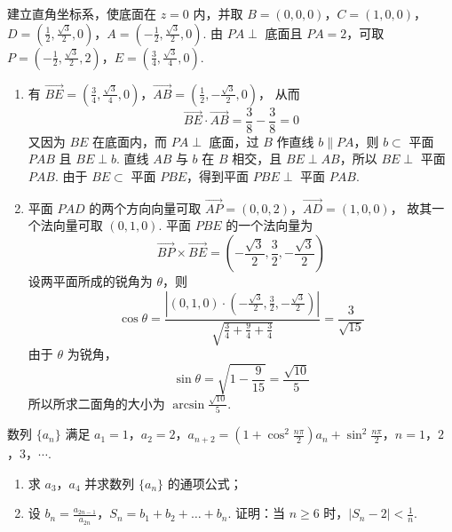 \begin{solution}
建立直角坐标系，使底面在 \(z=0\) 内，并取
\(B=\left(0,0,0\right)\)，\(C=\left(1,0,0\right)\)，\(D=\left(\frac12,\frac{\sqrt3}{2},0\right)\)，\(A=\left(-\frac12,\frac{\sqrt3}{2},0\right)\).
由 \(PA\perp\) 底面且 \(PA=2\)，可取
\(P=\left(-\frac12,\frac{\sqrt3}{2},2\right)\)，\(E=\left(\frac34,\frac{\sqrt3}{4},0\right)\).
\begin{enumerate}
\item 有
\(\overrightarrow{BE}=\left(\frac34,\frac{\sqrt3}{4},0\right)\)，\(\overrightarrow{AB}=\left(\frac12,-\frac{\sqrt3}{2},0\right)\)，
从而
\[
\overrightarrow{BE}\cdot\overrightarrow{AB}
=\frac38-\frac38=0
\]
又因为 \(BE\) 在底面内，而 \(PA\perp\) 底面，过 \(B\) 作直线 \(b\parallel PA\)，则 \(b\subset\) 平面 \(PAB\) 且 \(BE\perp b\). 直线 \(AB\) 与 \(b\) 在 \(B\) 相交，且 \(BE\perp AB\)，所以 \(BE\perp\) 平面 \(PAB\). 由于 \(BE\subset\) 平面 \(PBE\)，得到平面 \(PBE\perp\) 平面 \(PAB\).
\item 平面 \(PAD\) 的两个方向向量可取
\(\overrightarrow{AP}=\left(0,0,2\right)\)，\(\overrightarrow{AD}=\left(1,0,0\right)\)，
故其一个法向量可取 \(\left(0,1,0\right)\). 平面 \(PBE\) 的一个法向量为
\[
\overrightarrow{BP}\times\overrightarrow{BE}
=\left(-\frac{\sqrt3}{2},\frac32,-\frac{\sqrt3}{2}\right)
\]
设两平面所成的锐角为 \(\theta\)，则
\[
\cos\theta
=\frac{\left\lvert\left(0,1,0\right)\cdot
\left(-\frac{\sqrt3}{2},\frac32,-\frac{\sqrt3}{2}\right)\right\rvert}
{\sqrt{\frac34+\frac94+\frac34}}
=\frac3{\sqrt{15}}
\]
由于 \(\theta\) 为锐角，
\[
\sin\theta=\sqrt{1-\frac9{15}}=\frac{\sqrt{10}}5
\]
所以所求二面角的大小为 \(\arcsin\frac{\sqrt{10}}5\).
\end{enumerate}
\end{solution}

\begin{problem}
数列 \( \{a_{n}\} \) 满足 \(a_{1}=1\)，\(a_{2}=2\)，\(a_{n+2}=\left(1+\cos^{2}\frac{n\pi}{2}\right)a_{n}+\sin^{2}\frac{n\pi}{2}\)，\(n=1\)，\(2\)，\(3\)，\(\cdots\).
\begin{enumerate}
\item 求 \(a_{3}\)，\(a_{4}\) 并求数列 \( \{a_{n}\} \) 的通项公式；
\item 设 \(b_{n} = \frac{a_{2n - 1}}{a_{2n}}\)，\(S_{n} = b_{1} + b_{2} + \dots + b_{n}\). 证明：当 \( n \geqslant 6 \) 时，\( |S_{n} - 2| < \frac{1}{n} \).
\end{enumerate}
\end{problem}

